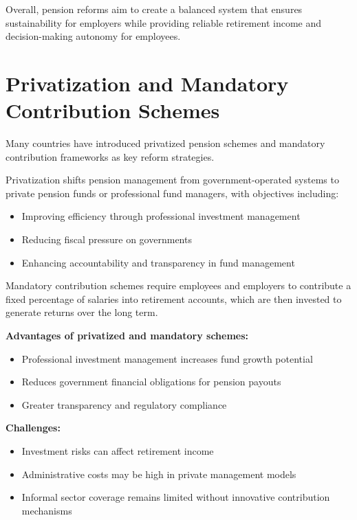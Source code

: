\documentclass[12pt,a4paper]{article}
\begin{document}
Overall, pension reforms aim to create a balanced system that ensures sustainability for employers while providing reliable retirement income and decision-making autonomy for employees.

\section{Privatization and Mandatory Contribution Schemes}

Many countries have introduced privatized pension schemes and mandatory contribution frameworks as key reform strategies.

Privatization shifts pension management from government-operated systems to private pension funds or professional fund managers, with objectives including:
\begin{itemize}
    \item Improving efficiency through professional investment management
    \item Reducing fiscal pressure on governments
    \item Enhancing accountability and transparency in fund management
\end{itemize}

Mandatory contribution schemes require employees and employers to contribute a fixed percentage of salaries into retirement accounts, which are then invested to generate returns over the long term.

\textbf{Advantages of privatized and mandatory schemes:}
\begin{itemize}
    \item Professional investment management increases fund growth potential
    \item Reduces government financial obligations for pension payouts
    \item Greater transparency and regulatory compliance
\end{itemize}

\textbf{Challenges:}
\begin{itemize}
    \item Investment risks can affect retirement income
    \item Administrative costs may be high in private management models
    \item Informal sector coverage remains limited without innovative contribution mechanisms
\end{itemize}
\end{document}
